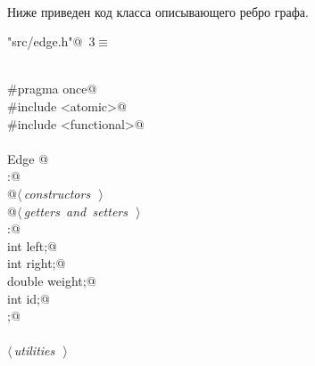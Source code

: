 \documentclass[12pt]{article}
\begin{document}
\paragraph{}
Ниже приведен код класса описывающего ребро графа.
\begin{flushleft} \small
\begin{minipage}{\linewidth}\label{scrap1}\raggedright\small
{} \verb@"src/edge.h"@\nobreak\ {\footnotesize {3}}$\equiv$
\vspace{-1ex}
\begin{list}{}{} \item
\mbox{}\verb@@\\
\mbox{}\verb@#pragma once@\\
\mbox{}\verb@#include <atomic>@\\
\mbox{}\verb@#include <functional>@\\
\mbox{}\verb@@\\
\mbox{}\verb@class Edge {@\\
\mbox{}\verb@public:@\\
\mbox{}\verb@    @\hbox{$\langle\,${\itshape constructors}\nobreak\ {\footnotesize {}}$\,\rangle$}\verb@@\\
\mbox{}\verb@    @\hbox{$\langle\,${\itshape getters and setters}\nobreak\ {\footnotesize {}}$\,\rangle$}\verb@@\\
\mbox{}\verb@private:@\\
\mbox{}\verb@    int left;@\\
\mbox{}\verb@    int right;@\\
\mbox{}\verb@    double weight;@\\
\mbox{}\verb@    int id;@\\
\mbox{}\verb@};@\\
\mbox{}\verb@@\\
\mbox{}\verb@@\hbox{$\langle\,${\itshape utilities}\nobreak\ {\footnotesize {}}$\,\rangle$}\verb@@\\
\mbox{}\verb@@\\
\mbox{}\verb@@{\NWsep}
\end{list}
\vspace{-1.5ex}
\footnotesize
\begin{list}{}{\setlength{\itemsep}{-\parsep}\setlength{\itemindent}{-\leftmargin}}

\item{}
\end{list}
\end{minipage}\vspace{4ex}
\end{flushleft}
\end{document}
